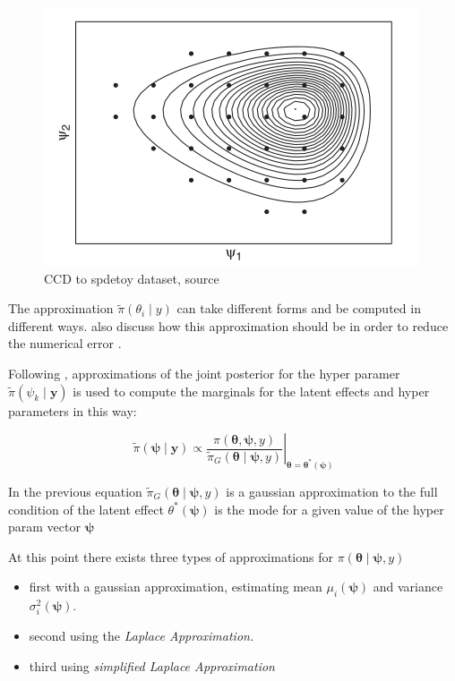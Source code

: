 \documentclass[
  12pt,
  a4paper,
  oneside]{book}
\providecommand{\tightlist}{%
  \setlength{\itemsep}{0pt}\setlength{\parskip}{0pt}}
\begin{document}
\begin{figure}
\centering
\includegraphics{images/CCDapplied.PNG}
\caption{CCD to spdetoy dataset, source \citet{Blangiardo-Cameletti}}
\end{figure}

The approximation \(\tilde{\pi}\left(\theta_{i} \mid y\right)\) can take different forms and be computed in different ways. \citet{Rue2009} also discuss how this approximation should be in order to reduce the numerical error \citep{Krainski-Rubio}.

Following \citet{Bayesian_INLA_Rubio}, approximations of the joint posterior for the hyper paramer \(\tilde\pi\left(\psi_{k} \mid \boldsymbol{y}\right)\) is used to compute the marginals for the latent effects and hyper parameters in this way:

\[
\left.\tilde{\pi}(\boldsymbol{\psi} \mid \mathbf{y}) \propto \frac{\pi(\boldsymbol{\theta}, \boldsymbol{\psi}, y)}{\tilde{\pi}_{G}(\boldsymbol{\theta} \mid \boldsymbol{\psi}, y)}\right|_{\boldsymbol{\theta}=\boldsymbol{\theta}^{*}(\boldsymbol{\psi})}
\]

In the previous equation \(\tilde{\pi}_{G}(\boldsymbol{\theta} \mid \boldsymbol{\psi}, y)\) is a gaussian approximation to the full condition of the latent effect \({\theta}^{*}(\boldsymbol{\psi})\) is the mode for a given value of the hyper param vector \(\boldsymbol{\psi}\)

At this point there exists three types of approximations for \(\pi\left(\boldsymbol{\theta} \mid \boldsymbol{\psi}, y\right)\)

\begin{itemize}
\tightlist
\item
  first with a gaussian approximation, estimating mean \(\mu_{i}(\boldsymbol{\psi})\) and variance \(\sigma_{i}^{2}(\boldsymbol{\psi})\).
\item
  second using the \emph{Laplace Approximation.}
\item
  third using \emph{simplified Laplace Approximation}
\end{itemize}
\end{document}
